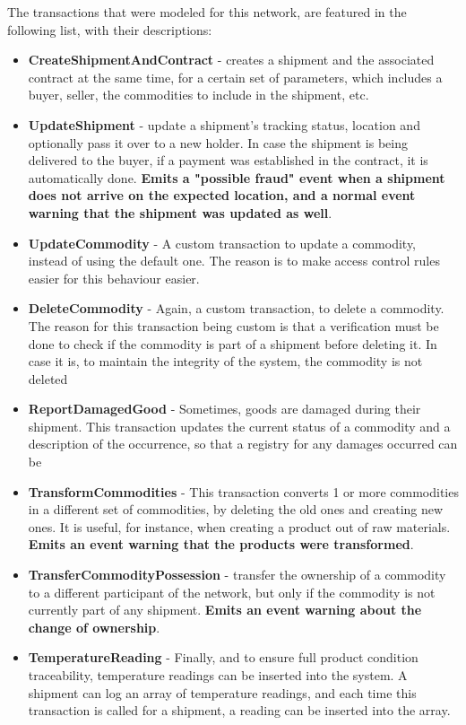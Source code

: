The transactions that were modeled for this network, are featured in the following list, with their descriptions: 
\begin{itemize}
    \item \textbf{CreateShipmentAndContract} - creates a shipment and the associated contract at the same time, for a certain set of parameters, which includes a buyer, seller, the commodities to include in the shipment, etc.
    \item \textbf{UpdateShipment} - update a shipment's tracking status, location and optionally pass it over to a new holder. In case the shipment is being delivered to the buyer, if a payment was established in the contract, it is automatically done. \textbf{Emits a "possible fraud" event when a shipment does not arrive on the expected location, and a normal event warning that the shipment was updated as well}.
    \item \textbf{UpdateCommodity} - A custom transaction to update a commodity, instead of using the default one. The reason is to make access control rules easier for this behaviour easier.
    \item \textbf{DeleteCommodity} - Again, a custom transaction, to delete a commodity. The reason for this transaction being custom is that a verification must be done to check if the commodity is part of a shipment before deleting it. In case it is, to maintain the integrity of the system, the commodity is not deleted
    \item \textbf{ReportDamagedGood} - Sometimes, goods are damaged during their shipment. This transaction updates the current status of a commodity and a description of the occurrence, so that a registry for any damages occurred can be
    \item \textbf{TransformCommodities} - This transaction converts 1 or more commodities in a different set of commodities, by deleting the old ones and creating new ones. It is useful, for instance, when creating a product out of raw materials. \textbf{Emits an event warning that the products were transformed}.
    \item \textbf{TransferCommodityPossession} - transfer the ownership of a commodity to a different participant of the network, but only if the commodity is not currently part of any shipment. \textbf{Emits an event warning about the change of ownership}.
    \item \textbf{TemperatureReading} - Finally, and to ensure full product condition traceability, temperature readings can be inserted into the system. A shipment can log an array of temperature readings, and each time this transaction is called for a shipment, a reading can be inserted into the array.
\end{itemize}

